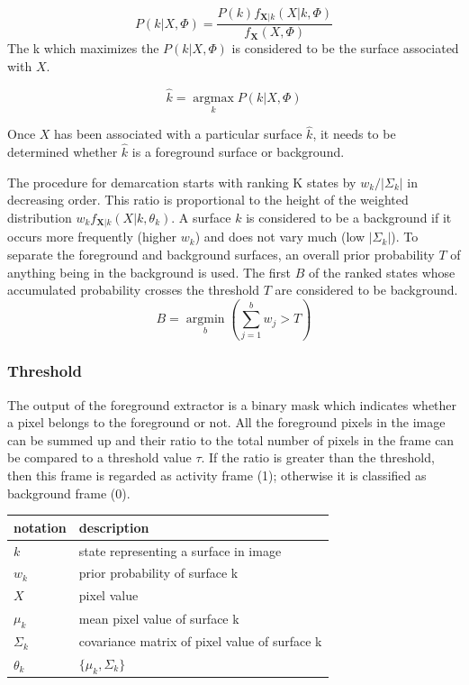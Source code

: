 $$ P(k|X,\Phi) = \frac{P(k)f_{\mathbf{X}|k}(X|k,\Phi)}{f_\mathbf{X}(X,\Phi)} $$
The k which maximizes the $P(k|X,\Phi) $ is considered to be the surface associated with $X$.

$$ \hat{k}=\operatorname*{argmax}_k P(k|X,\Phi)$$

Once $X$ has been associated with a particular surface $\hat{k}$, it needs to be determined whether $\hat{k}$ is a foreground surface or background. 

The procedure for demarcation starts with ranking K states by $w_k / | \Sigma_k |$ in decreasing order. This ratio is proportional to the height of the weighted distribution $w_k f_{\mathbf{X}|k}(X|k,\theta_k)$. A surface $k$ is considered to be a background if it occurs more frequently (higher $w_k$) and does not vary much (low $|\Sigma_k|$).  To separate the foreground and background surfaces, an overall prior probability $T$ of anything being in the background is used. The first $B$ of the ranked  states whose accumulated probability crosses the threshold $T$ are considered to be background. 
$$ B=\operatorname*{argmin}_b (\sum_{j=1}^b w_{j} > T)$$ 

\subsubsection{Threshold}
The output of the foreground extractor is a binary mask which indicates whether a pixel belongs to the foreground or not. All the foreground pixels in the image can be summed up and their ratio to the total number of pixels in the frame can be compared to a threshold value $\tau$. If the ratio is greater than the threshold, then this frame is regarded as activity frame (1); otherwise it is classified as background frame (0). 

\begin{table}[]
\begin{tabular}{| l | l |} \hline
notation                 & description                                   \\ \hline \hline
$k$                        & state representing a surface in image         \\ \hline
$w_k$                     & prior probability of surface k                \\ \hline
$X$                        & pixel value                                   \\ \hline
$\mu_k$   & mean pixel value of surface k                 \\ \hline
$\Sigma_k$ & covariance matrix of pixel value of surface k \\ \hline
$\theta_k$ & $\{ \mu_k, \Sigma_k \}$  \\ \hline                         
\end{tabular}
\end{table}

